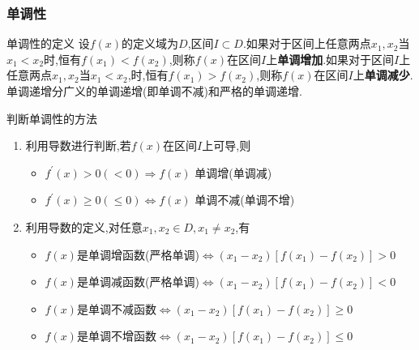 \documentclass[8pt a4paper, oneside, UTF8]{ctexbook}  %
\begin{document}
\begin{sloppypar}
    \subsubsection{单调性}\label{ddx}
    \begin{defn}{单调性的定义}{}
        设$f(x)$的定义域为$D$,区间$I \subset D$.如果对于区间上任意两点$x_1,x_2$当$x_1 < x_2$时,恒有$f(x_1) < f(x_2)$,则称$f(x)$在区间$I$上\textbf{单调增加}.如果对于区间$I$上任意两点$x_1,x_2$当$x_1<x_2$,时,恒有$f(x_1)>f(x_2)$,则称$f(x)$在区间$I$上\textbf{单调减少}.
        \tcblower
        单调递增分广义的单调递增(即单调不减)和严格的单调递增.
    \end{defn}
    判断单调性的方法
    \begin{enumerate}
        \item 利用导数进行判断,若$f(x)$在区间$I$上可导,则
              \begin{itemize}
                  \item $f^{\prime}(x)>0(<0)\Rightarrow f(x)$ 单调增(单调减)
                  \item $f^{\prime}(x)\geqslant0(\leqslant0)\Leftrightarrow f(x)$ 单调不减(单调不增)
              \end{itemize}
        \item 利用导数的定义,对任意$x_1,x_2\in D,x_1\neq x_2$,有
              \begin{itemize}
                  \item $f\left(x\right)$是单调增函数(严格单调)$\Leftrightarrow\left(x_{1}-x_{2}\right)\left[f\left(x_{1}\right)-f\left(x_{2}\right)\right]>0$
                  \item $f(x)$是单调减函数(严格单调)$\Leftrightarrow(x_{1}-x_{2})[f(x_{1})-f(x_{2})]<0$
                  \item $f(x)$是单调不减函数$\Leftrightarrow(x_{1}-x_{2})[f(x_{1})-f(x_{2})]\geqslant0$
                  \item $f\left(x\right)$是单调不增函数$\Leftrightarrow\left(x_{1}-x_{2}\right)\left[f\left(x_{1}\right)-f\left(x_{2}\right)\right]\leqslant0$
              \end{itemize}
    \end{enumerate}

\end{sloppypar}
\end{document}
